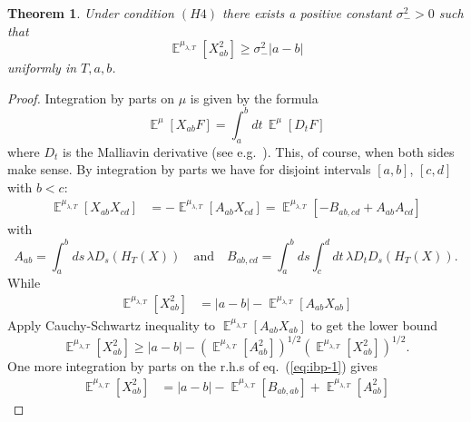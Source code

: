 \documentclass[a4paper,12pt,reqno]{amsart}
\newtheorem{theorem}{Theorem}
\DeclareMathOperator{\expect}{{\mathbb E}}
\begin{document}
\begin{theorem}
\label{th:lower}
Under condition $(H4)$
 there exists a positive constant $\sigma^2_->0$ such that
$$
\expect^{\mu_{\lambda,T}} [X_{ab}^2 ] \ge \sigma^2_- |a-b|
$$
uniformly in $T,a,b$.
\end{theorem}
\begin{proof}
Integration by parts on $\mu$ is given by the formula
\begin{equation*}
 \expect^{\mu} [X_{ab} F] = \int_{a}^b dt \, \expect^{\mu}[ D_t F ] 
\end{equation*}
where $D_t$ is the Malliavin derivative (see e.g.~\cite{nualart}). This, of course, when both sides make sense.
By integration by parts  we have for
disjoint intervals $[a,b]$, $[c,d]$ with $b < c$:
\begin{equation}
  \begin{split}
\expect^{\mu_{\lambda,T}} [X_{ab} X_{cd}] & =  -
 \expect^{\mu_{\lambda,T}} [A_{ab} X_{cd}]      
=
\expect^{\mu_{\lambda,T}} [- B_{ab,cd} + A_{ab} A_{cd}]      
  \end{split}
\end{equation}
with
$$
A_{ab} = \int_{a}^{b}ds\, \lambda D_{s}(H_T(X))
\quad\text{and}\quad
B_{ab,cd} = \int_{a}^{b}ds \int_{c}^{d}dt\, \lambda D_t D_{s}(H_T(X)).
$$
While
\begin{equation}
\label{eq:ibp-1}
  \begin{split}
\expect^{\mu_{\lambda,T}} [X_{ab}^2 ] & = |a-b|  -
 \expect^{\mu_{\lambda,T}} [A_{ab} X_{ab}]      
  \end{split}
\end{equation}
Apply Cauchy-Schwartz inequality to $\expect^{\mu_{\lambda,T}} [A_{ab} X_{ab}]  $ to get the lower bound
\begin{equation}
\label{eq:ineq-1}
  \expect^{\mu_{\lambda,T}} [X_{ab}^2 ] \ge 
|a-b|  -
 \left(\expect^{\mu_{\lambda,T}} [A_{ab}^2] \right)^{1/2}
\left(\expect^{\mu_{\lambda,T}}[ X_{ab}^2]\right)^{1/2}.
\end{equation}
One more integration by parts on the r.h.s of eq.~(\ref{eq:ibp-1}) gives
\begin{equation}
\label{eq:ibp-2}
  \begin{split}
\expect^{\mu_{\lambda,T}} [X_{ab}^2 ] &       
= |a-b| -  \expect^{\mu_{\lambda,T}} [ B_{ab,ab}] + \expect^{\mu_{\lambda,T}} [ A_{ab}^2]      
  \end{split}

\end{equation}
\end{proof}
\end{document}
